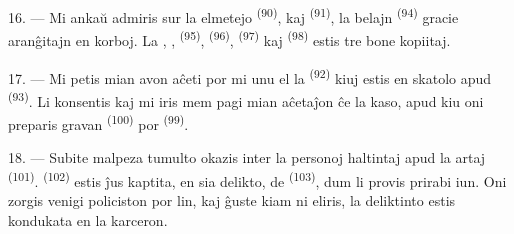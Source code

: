 16. --- Mi ankaŭ admiris sur la elmetejo 
\textsuperscript{(90)}, kaj  \textsuperscript{(91)}, la belajn
 \textsuperscript{(94)} gracie aranĝitajn en
korboj. La , , 
\textsuperscript{(95)},  \textsuperscript{(96)},
 \textsuperscript{(97)} kaj 
\textsuperscript{(98)} estis tre bone kopiitaj.

\VUsaut{4.4mm}
\VUsaut{2.8mm}

17. --- Mi petis mian avon aĉeti por mi unu el la 
\textsuperscript{(92)} kiuj estis en skatolo apud 
\textsuperscript{(93)}. Li konsentis kaj mi iris mem pagi mian aĉetaĵon ĉe la
kaso, apud kiu oni preparis gravan  \textsuperscript{(100)}
por  \textsuperscript{(99)}.

18. --- Subite malpeza tumulto okazis inter la personoj haltintaj apud la artaj
 \textsuperscript{(101)}. 
\textsuperscript{(102)} estis ĵus kaptita, en sia delikto, de 
\textsuperscript{(103)}, dum li provis prirabi iun. Oni zorgis venigi policiston
por  lin, kaj ĝuste kiam ni eliris, la deliktinto estis
kondukata en la karceron.
\VUsaut{6.0mm}
\VUfilet{22mm}
